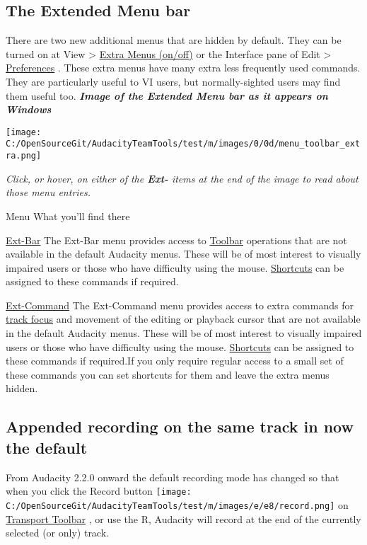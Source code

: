 \begin{multicols}{2}
\subsection{The Extended Menu bar}There are two new additional menus that are hidden by default.  They can be turned on at View > 
\hyperref[\foo{view_menu_extra_menus_onoff}]{Extra Menus (on/off)}
 or the Interface pane of Edit > 
\hyperref[\foo{interface_preferences_}]{Preferences}
.
These extra menus have many extra less frequently used commands.  They are particularly useful to VI users, but normally-sighted users may find them useful too.
\textit{\textbf{Image of the Extended Menu bar as it appears on Windows}}\par \protect\texttt{[image: C:/OpenSourceGit/AudacityTeamTools/test/m/images/0/0d/menu\_toolbar\_extra.png]}\par \textit{Click, or hover, on either of the \textbf{Ext-} items at the end of the image to read about those menu entries.}\par Menu
What you'll find there
\par 
\hyperref[\foo{ext_bar_menu_}]{Ext-Bar}
The Ext-Bar menu provides access to 
\hyperref[\foo{toolbars_overview_}]{Toolbar}
 operations that are not available in the default Audacity menus. These will be of most interest to visually impaired users or those who have difficulty using the mouse.
\hyperref[\foo{keyboard_preferences_}]{Shortcuts}
 can be assigned to these commands if required.\par 
\hyperref[\foo{ext_command_menu_}]{Ext-Command}
The Ext-Command menu provides access to extra commands for 
\hyperref[\foo{audio_tracks_focus}]{track focus}
 and movement of the editing or playback cursor that are not available in the default Audacity menus. These will be of most interest to visually impaired users or those who have difficulty using the mouse.
\hyperref[\foo{keyboard_preferences_}]{Shortcuts}
 can be assigned to these commands if required.If you only require regular access to a small set of these commands you can set shortcuts for them and leave the extra menus hidden.
\label{new_features_in_this_release_append}
\subsection{Appended recording on the same track in now the default}From Audacity 2.2.0 onward the default recording mode has changed so that when you click the Record button \protect\texttt{[image: C:/OpenSourceGit/AudacityTeamTools/test/m/images/e/e8/record.png]} on 
\hyperref[\foo{transport_toolbar_}]{Transport Toolbar}
, or use the R, Audacity will record at the end of the currently selected (or only) track.


\end{multicols}
